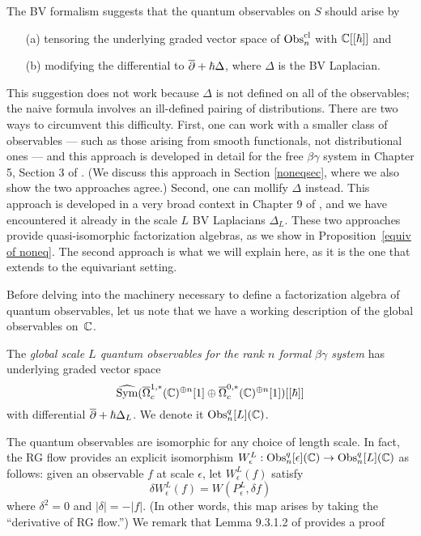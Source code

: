 The BV formalism suggests that the quantum observables on $S$ should arise by 
\begin{enumerate}
\item[(a)] tensoring the underlying graded vector space of ${\rm Obs}^{\rm cl}_n$ with $\mathbb C[[\hbar]]$ and
\item[(b)] modifying the differential to $\overline{\partial} +\hbar \Delta$, where $\Delta$ is the BV Laplacian.
\end{enumerate}
This suggestion does not work because $\Delta$ is not defined on all of the observables;
the naive formula involves an ill-defined pairing of distributions.
There are two ways to circumvent this difficulty. 
First, one can work with a smaller class of observables --- such as those arising from smooth functionals, not distributional ones --- and this approach is developed in detail for the free $\beta\gamma$ system in Chapter 5, Section 3 of \cite{CG1}.
(We discuss this approach in Section \ref{noneqsec}, where we also show the two approaches agree.) 
Second, one can mollify $\Delta$ instead.
This approach is developed in a very broad context in Chapter 9 of \cite{CG2},
and we have encountered it already in the scale $L$ BV Laplacians $\Delta_L$.
These two approaches provide quasi-isomorphic factorization algebras, 
as we show in Proposition~\ref{equiv of noneq}. The second approach is what we will explain here, as it is the one that extends to the equivariant setting.


Before delving into the machinery necessary to define a factorization algebra of quantum observables,
let us note that we have a working description of the global observables on~$\mathbb C$.

\begin{dfn}
The \emph{global scale $L$ quantum observables for the rank $n$ formal $\beta\gamma$ system} has
underlying graded vector space
\[
\widehat{{\rm Sym}}(\overline{\Omega}^{1,*}_c(\mathbb C)^{\oplus n}[1] \oplus \overline{\Omega}^{0,*}_c(\mathbb C)^{\oplus n}[1])[[\hbar]]
\]
with differential $\overline{\partial} + \hbar \Delta_L$. 
We denote it ${\rm Obs}^q_n[L](\mathbb C)$.
\end{dfn}

The quantum observables are isomorphic for any choice of length scale.
In fact, the RG flow provides an explicit isomorphism $W_\epsilon^L: {\rm Obs}^q_n[\epsilon](\mathbb C) \to {\rm Obs}^q_n[L](\mathbb C)$ as follows: 
given an observable $f$ at scale $\epsilon$, let $W_\epsilon^L(f)$ satisfy
\[
\delta W_\epsilon^L(f) = W(P_\epsilon^L, \delta f)
\]
where $\delta^2=0$ and $|\delta| = - |f|$. 
(In other words, this map arises by taking the ``derivative of RG flow.'')
We remark that Lemma 9.3.1.2 of \cite{CG2} provides a proof 


